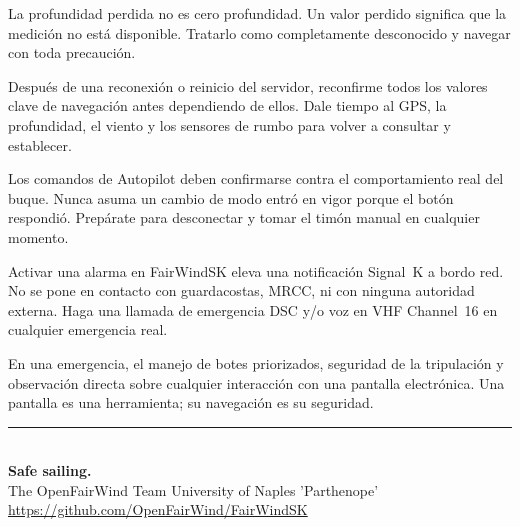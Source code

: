 \begin{warningbox}
La profundidad perdida no es cero profundidad.
Un valor perdido significa que la medición no está disponible.
Tratarlo como completamente desconocido y navegar con toda precaución.
\end{warningbox}

\begin{warningbox}
Después de una reconexión o reinicio del servidor, reconfirme todos los valores clave de navegación antes
dependiendo de ellos.
Dale tiempo al GPS, la profundidad, el viento y los sensores de rumbo para volver a consultar y establecer.
\end{warningbox}

\begin{warningbox}
Los comandos de Autopilot deben confirmarse contra el comportamiento real del buque.
Nunca asuma un cambio de modo entró en vigor porque el botón respondió.
Prepárate para desconectar y tomar el timón manual en cualquier momento.
\end{warningbox}

\begin{warningbox}
Activar una alarma en FairWindSK eleva una notificación Signal~K a bordo
red.
No se pone en contacto con guardacostas, MRCC, ni con ninguna autoridad externa.
Haga una llamada de emergencia DSC y/o voz en VHF Channel~16 en cualquier emergencia real.
\end{warningbox}

\begin{warningbox}
En una emergencia, el manejo de botes priorizados, seguridad de la tripulación y observación directa sobre
cualquier interacción con una pantalla electrónica.
Una pantalla es una herramienta; su navegación es su seguridad.
\end{warningbox}

\vfill
\begin{center}
  {\color{Teal}\rule{0.5\textwidth}{1pt}}\\[10pt]
  {\Large\sffamily\bfseries\color{Navy}Safe sailing.}\\[8pt]
  {\normalsize\sffamily\color{gray}
    The OpenFairWind Team \textbullet{}
    University of Naples 'Parthenope'}\\[4pt]
  {\small\sffamily\color{Teal}\url{https://github.com/OpenFairWind/FairWindSK}}
\end{center}
